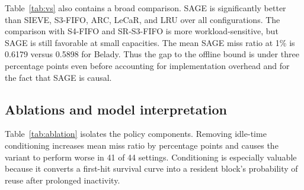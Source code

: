\documentclass[conference]{IEEEtran}
\begin{document}
\begin{table}[t]
\centering
\caption{SAGE miss-ratio reduction, wins, and one-sided Wilcoxon signed-rank $p$ over \nConfigs{} configurations.}
\label{tab:vs}
\scriptsize
\setlength{\tabcolsep}{3pt}
\resizebox{\columnwidth}{!}{}
\end{table}

Table~\ref{tab:vs} also contains a broad comparison. SAGE is significantly better than SIEVE, S3-FIFO, ARC, LeCaR, and LRU over all \nConfigs{} configurations. The comparison with S4-FIFO and SR-S3-FIFO is more workload-sensitive, but SAGE is still favorable at small capacities. The mean SAGE miss ratio at 1\% is 0.6179 versus 0.5898 for Belady. Thus the gap to the offline bound is under three percentage points even before accounting for implementation overhead and for the fact that SAGE is causal.

\subsection{Ablations and model interpretation}
Table~\ref{tab:ablation} isolates the policy components. Removing idle-time conditioning increases mean miss ratio by \ablNoCond{} percentage points and causes the variant to perform worse in 41 of 44 settings. Conditioning is especially valuable because it converts a first-hit survival curve into a resident block's probability of reuse after prolonged inactivity.
\end{document}
